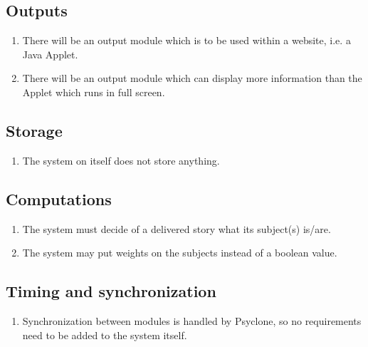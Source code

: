 \subsection{Outputs}

\begin{enumerate}
  \item There will be an output module which is to be used within a website, i.e. a Java Applet.
  \item There will be an output module which can display more information than
        the Applet which runs in full screen.
\end{enumerate}

\subsection{Storage}

\begin{enumerate}
  \item The system on itself does not store anything.
\end{enumerate}

\subsection{Computations}

\begin{enumerate}
  \item The system must decide of a delivered story what its subject(s) is/are.
  \item The system may put weights on the subjects instead of a boolean value.
\end{enumerate}

\subsection{Timing and synchronization}

\begin{enumerate}
  \item Synchronization between modules is handled by Psyclone, so no
        requirements need to be added to the system itself.
\end{enumerate}

